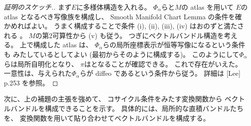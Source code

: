\documentclass[report]{jlreq}
\begin{document}
\begin{proof}[証明のスケッチ.]
    まず$E$に多様体構造を入れる。
    $\Phi_\alpha$らと$M$の atlas を用いて
    $E$の atlas となるべき写像族を構成し、
    Smooth Manifold Chart Lemma の条件を確かめればよい。
    うまく構成することで条件 (i), (ii), (iii), (iv) はおのずと満たされる
    。
    $M$の第2可算性から (v) も従う。
    つぎにベクトルバンドル構造を考える。
    上で構成した atlas は、
    $\Phi_\alpha$らの局所座標表示が恒等写像になるという条件も
    みたしているとしてよい (最初からそのように構成する)。
    このようにして$\Phi_\alpha$らは局所自明化となり、
    $\pi$は{\smooth}となることが確認できる。
    これで存在がいえた。
    一意性は、与えられた$\Phi_\alpha$らが
    diffeo であるという条件から従う。
    詳細は [Lee] p.253 を参照。
\end{proof}

次に、上の補題の主張を強めて、
コサイクル条件をみたす変換関数から
ベクトルバンドルを構成できることを示す。
具体的には、局所的な直積バンドルたちを、
変換関数を用いて貼り合わせてベクトルバンドルを構成する。
\end{document}
